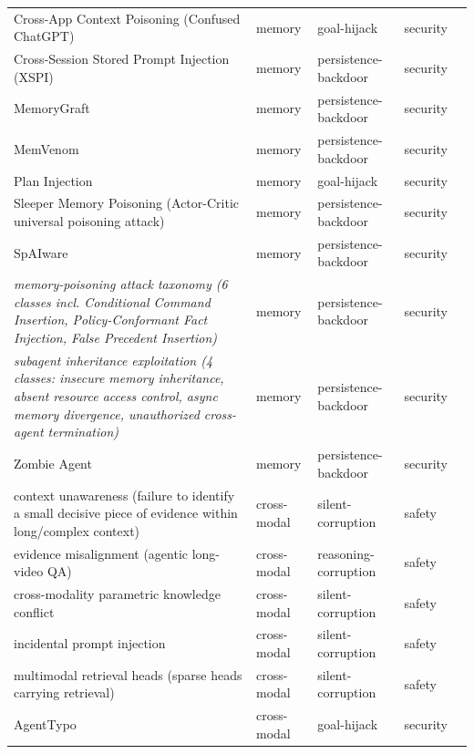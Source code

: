 \begin{longtable}{@{}p{}llll@{}}
Cross-App Context Poisoning (Confused ChatGPT) & memory & goal-hijack & security & \cite{wang-2026-confused} \\
Cross-Session Stored Prompt Injection (XSPI) & memory & persistence-backdoor & security & \cite{xie-2026-prompt} \\
MemoryGraft & memory & persistence-backdoor & security & \cite{srivastava-2025-memorygraft} \\
MemVenom & memory & persistence-backdoor & security & \cite{zhang-2026-memvenom} \\
Plan Injection & memory & goal-hijack & security & \cite{patlan-2025-context} \\
Sleeper Memory Poisoning (Actor-Critic universal poisoning attack) & memory & persistence-backdoor & security & \cite{pulipaka-2026-hidden} \\
SpAIware & memory & persistence-backdoor & security & \cite{rehberger-2024-trust} \\
\emph{memory-poisoning attack taxonomy (6 classes incl. Conditional Command Insertion, Policy-Conformant Fact Injection, False Precedent Insertion)} & memory & persistence-backdoor & security & \cite{dash-2026-untrusted} \\
\emph{subagent inheritance exploitation (4 classes: insecure memory inheritance, absent resource access control, async memory divergence, unauthorized cross-agent termination)} & memory & persistence-backdoor & security & \cite{cai-2026-child} \\
Zombie Agent & memory & persistence-backdoor & security & \cite{yang-2026-zombie} \\
context unawareness (failure to identify a small decisive piece of evidence within long/complex context) & cross-modal & silent-corruption & safety & \cite{xu-2026-contextaware} \\
evidence misalignment (agentic long-video QA) & cross-modal & reasoning-corruption & safety & \cite{qiu-2026-videoseal} \\
cross-modality parametric knowledge conflict & cross-modal & silent-corruption & safety & \cite{zhu-2024-unraveling} \\
incidental prompt injection & cross-modal & silent-corruption & safety & \cite{clusmann-2024-pen} \\
multimodal retrieval heads (sparse heads carrying retrieval) & cross-modal & silent-corruption & safety & \cite{li-2026-retrieval} \\
AgentTypo & cross-modal & goal-hijack & security & \cite{li-2025-agenttypo} \\

\end{longtable}
